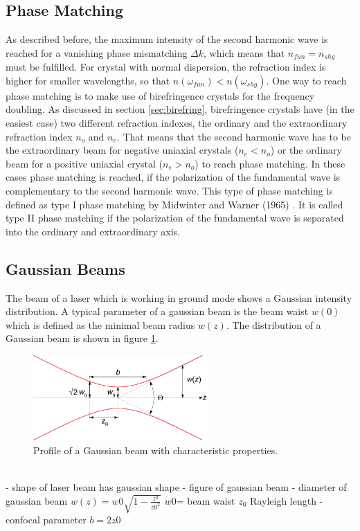 \documentclass[10pt, a4paper, notitlepage, DIV=15]{scrartcl}
\begin{document}
\subsection{Phase Matching}
As described before, the maximum intensity of the second harmonic wave is reached for a vanishing phase mismatching $\Delta k$, which means that $n_{fun}=n_{shg}$ must be fulfilled. For crystal with normal dispersion, the refraction index is higher for smaller wavelengths, so that $n(\omega_{fun})<n(\omega_{shg})$.
\newline One way to reach phase matching is to make use of birefringence crystals for the frequency doubling. As discussed in section \ref{sec:birefring}, birefringence crystals have (in the easiest case) two different refraction indexes, the ordinary and the extraordinary refraction index $n_o$ and $n_e$. That means that the second harmonic wave has to be the extraordinary beam for negative uniaxial crystals ($n_e<n_o$) or the ordinary beam for a positive uniaxial crystal ($n_e>n_o$) to reach phase matching. In these cases phase matching is reached, if the polarization of the fundamental wave is complementary to the second harmonic wave. This type of phase matching is defined as type I phase matching by Midwinter and Warner (1965) \cite{boyd}. It is called type II phase matching if the polarization of the fundamental wave is separated into the ordinary and extraordinary axis. \cite{meschede}

\subsection{Gaussian Beams}
The beam of a laser which is working in ground mode shows a Gaussian intensity distribution. A typical parameter of a gaussian beam is the beam waist $w(0)$ which is defined as the minimal beam radius $w(z)$. \cite{kühlke}\newline
The distribution of a Gaussian beam is shown in figure \ref{fig:gauss}.
\begin{figure}[h]
	\centering
	\includegraphics[width=0.6\textwidth]{gaussian_beam}
	\caption{Profile of a Gaussian beam with characteristic properties. \cite{wiki_gauss}}
	\label{fig:gauss}
\end{figure}
\newline
\\
- shape of laser beam has gaussian shape 
- figure of gaussian beam
- diameter of gaussian beam $w(z)=w0\sqrt{1-\frac{z^2}{z0^2}}$ $w0$= beam waist $z_0$ Rayleigh length 
- confocal parameter $b=2z0$
\end{document}
